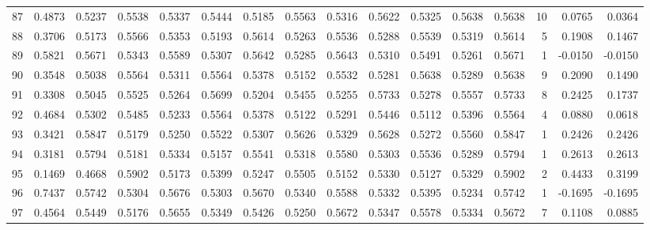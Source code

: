 \begin{tabular}{lrrrrrrrrrrrrrrr}
87  &      0.4873 &  0.5237 &  0.5538 &  0.5337 &  0.5444 &  0.5185 &  0.5563 &  0.5316 &  0.5622 &  0.5325 &   0.5638 &     0.5638 &     10 &                    0.0765 &                     0.0364 \\
88  &      0.3706 &  0.5173 &  0.5566 &  0.5353 &  0.5193 &  0.5614 &  0.5263 &  0.5536 &  0.5288 &  0.5539 &   0.5319 &     0.5614 &      5 &                    0.1908 &                     0.1467 \\
89  &      0.5821 &  0.5671 &  0.5343 &  0.5589 &  0.5307 &  0.5642 &  0.5285 &  0.5643 &  0.5310 &  0.5491 &   0.5261 &     0.5671 &      1 &                   -0.0150 &                    -0.0150 \\
90  &      0.3548 &  0.5038 &  0.5564 &  0.5311 &  0.5564 &  0.5378 &  0.5152 &  0.5532 &  0.5281 &  0.5638 &   0.5289 &     0.5638 &      9 &                    0.2090 &                     0.1490 \\
91  &      0.3308 &  0.5045 &  0.5525 &  0.5264 &  0.5699 &  0.5204 &  0.5455 &  0.5255 &  0.5733 &  0.5278 &   0.5557 &     0.5733 &      8 &                    0.2425 &                     0.1737 \\
92  &      0.4684 &  0.5302 &  0.5485 &  0.5233 &  0.5564 &  0.5378 &  0.5122 &  0.5291 &  0.5446 &  0.5112 &   0.5396 &     0.5564 &      4 &                    0.0880 &                     0.0618 \\
93  &      0.3421 &  0.5847 &  0.5179 &  0.5250 &  0.5522 &  0.5307 &  0.5626 &  0.5329 &  0.5628 &  0.5272 &   0.5560 &     0.5847 &      1 &                    0.2426 &                     0.2426 \\
94  &      0.3181 &  0.5794 &  0.5181 &  0.5334 &  0.5157 &  0.5541 &  0.5318 &  0.5580 &  0.5303 &  0.5536 &   0.5289 &     0.5794 &      1 &                    0.2613 &                     0.2613 \\
95  &      0.1469 &  0.4668 &  0.5902 &  0.5173 &  0.5399 &  0.5247 &  0.5505 &  0.5152 &  0.5330 &  0.5127 &   0.5329 &     0.5902 &      2 &                    0.4433 &                     0.3199 \\
96  &      0.7437 &  0.5742 &  0.5304 &  0.5676 &  0.5303 &  0.5670 &  0.5340 &  0.5588 &  0.5332 &  0.5395 &   0.5234 &     0.5742 &      1 &                   -0.1695 &                    -0.1695 \\
97  &      0.4564 &  0.5449 &  0.5176 &  0.5655 &  0.5349 &  0.5426 &  0.5250 &  0.5672 &  0.5347 &  0.5578 &   0.5334 &     0.5672 &      7 &                    0.1108 &                     0.0885 \\

\end{tabular}
